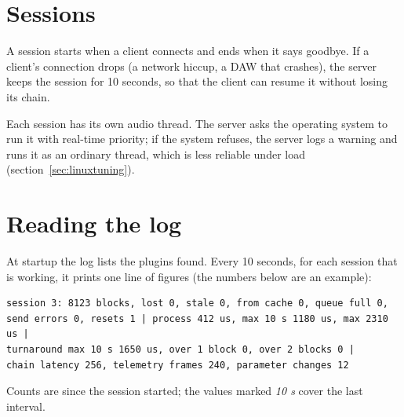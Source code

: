 \section{Sessions}

A session starts when a client connects and ends when it says goodbye. If a
client's connection drops (a network hiccup, a DAW that crashes), the server
keeps the session for 10 seconds, so that the client can resume it without
losing its chain.

Each session has its own audio thread. The server asks the operating system
to run it with real-time priority; if the system refuses, the server logs a
warning and runs it as an ordinary thread, which is less reliable under load
(section~\ref{sec:linuxtuning}).

\section{Reading the log}
\label{sec:log}

At startup the log lists the plugins found. Every 10 seconds, for each
session that is working, it prints one line of figures (the numbers
below are an example):

\begin{lstlisting}[language={}]
session 3: 8123 blocks, lost 0, stale 0, from cache 0, queue full 0,
send errors 0, resets 1 | process 412 us, max 10 s 1180 us, max 2310 us |
turnaround max 10 s 1650 us, over 1 block 0, over 2 blocks 0 |
chain latency 256, telemetry frames 240, parameter changes 12
\end{lstlisting}

Counts are since the session started; the values marked \emph{10 s} cover the
last interval.

